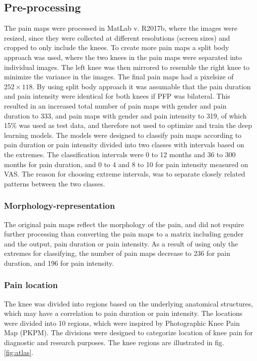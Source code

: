 \subsection*{\textbf{Pre-processing}}
The pain maps were processed in MatLab v. R2017b, where the images were resized, since they were collected at different resolutions (screen sizes) and cropped to only include the knees. To create more pain maps a split body approach was used, where the two knees in the pain maps were separated into individual images. The left knee was then mirrored to resemble the right knee to minimize the variance in the images. The final pain maps had a pixelsize of $252 \times 118$.
By using split body approach it was assumable that the pain duration and pain intensity were identical for both knees if PFP was bilateral. This resulted in an increased total number of pain maps with gender and pain duration to 333, and pain maps with gender and pain intensity to 319, of which 15\% was used as test data, and therefore not used to optimize and train the deep learning models. \newline
\noindent
The models were designed to classify pain maps according to pain duration or pain intensity divided into two classes with intervals based on the extremes. The classification intervals were 0 to 12 months and 36 to 300 months for pain duration, and 0 to 4 and 8 to 10 for pain intensity measured on VAS. The reason for choosing extreme intervals, was to separate closely related patterns between the two classes.

\subsubsection*{\textbf{Morphology-representation}}
The original pain maps reflect the morphology of the pain, and did not require further processing than converting the pain maps to a matrix including gender and the output, pain duration or pain intensity. As a result of using only the extremes for classifying, the number of pain maps decrease to 236 for pain duration, and 196 for pain intensity.

\subsubsection*{\textbf{Pain location}} 
The knee was divided into regions based on the underlying anatomical structures, which may have a correlation to pain duration or pain intensity.
The locations were divided into 10 regions, which were inspired by Photographic Knee Pain Map (PKPM). The divisions were designed to categorize location of knee pain for diagnostic and research purposes.\citep{Elson2010} The knee regions are illustrated in fig. \ref{fig:atlas}.

